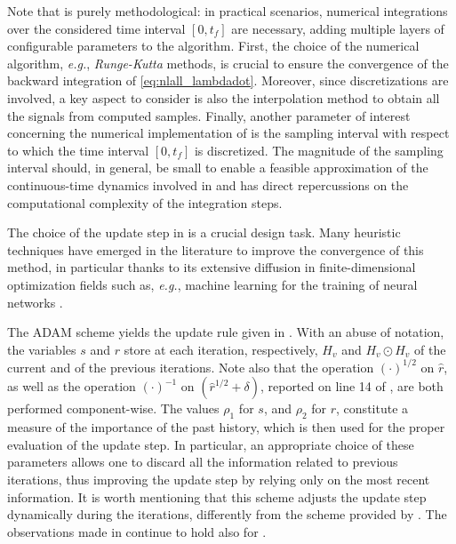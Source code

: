 \begin{remark}
  \label{rem:nlall_dt}
  Note that  is purely methodological: in practical scenarios, numerical integrations over the considered time interval $[0,t_f]$ are necessary, adding multiple layers of configurable parameters to the algorithm. First, the choice of the numerical algorithm, \emph{e.g.}, \emph{Runge-Kutta} methods, is crucial to ensure the convergence of the backward integration of \eqref{eq:nlall_lambdadot}. Moreover, since discretizations are involved, a key aspect to consider is also the interpolation method to obtain all the signals from computed samples. Finally, another parameter of interest concerning the numerical implementation of  is the sampling interval with respect to which the time interval $[0,t_f]$ is discretized. The magnitude of the sampling interval should, in general, be small to enable a feasible approximation of the continuous-time dynamics involved in  and has direct repercussions on the computational complexity of the integration steps.\closeremark
\end{remark}

The choice of the update step in  is a crucial design task. Many heuristic techniques have emerged in the literature to improve the convergence of this method, in particular thanks to its extensive diffusion in finite-dimensional optimization fields such as, \emph{e.g.}, machine learning for the training of neural networks \cite{goodfellow_deep_2016}.

The ADAM scheme yields the update rule given in . With an abuse of notation, the variables $s$ and $r$ store at each iteration, respectively, $H_v$ and $H_v \odot H_v$ of the current and of the previous iterations. Note also that the operation $(\cdot)^{1/2}$ on $\hat{r}$, as well as the operation $(\cdot)^{-1}$ on $(\hat{r}^{1/2}+\delta)$, reported on line 14 of , are both performed component-wise. The values $\rho_1$ for $s$, and $\rho_2$ for $r$, constitute a measure of the importance of the past history, which is then used for the proper evaluation of the update step. In particular, an appropriate choice of these parameters allows one to discard all the information related to previous iterations, thus improving the update step by relying only on the most recent information. It is worth mentioning that this scheme adjusts the update step dynamically during the iterations, differently from the scheme provided by . The observations made in  continue to hold also for .

